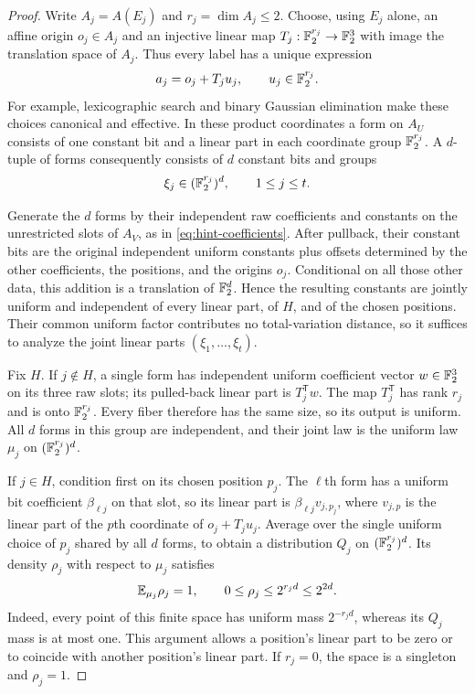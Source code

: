 \begin{proof}
Write $A_j=A(E_j)$ and $r_j=\dim A_j\le2$. Choose, using $E_j$ alone,
an affine origin $o_j\in A_j$ and an injective linear map
$T_j:\mathbb F_2^{r_j}\to\mathbb F_2^3$ with image the translation space of $A_j$.
Thus every label has a unique expression
\[
 a_j=o_j+T_ju_j,\qquad u_j\in\mathbb F_2^{r_j}.
\]
For example, lexicographic search and binary Gaussian elimination make
these choices canonical and effective. In these product coordinates a
form on $A_U$ consists of one constant bit and a linear part in each
coordinate group $\mathbb F_2^{r_j}$. A $d$-tuple of forms consequently consists
of $d$ constant bits and groups
\[
 \xi_j\in(\mathbb F_2^{r_j})^d,\qquad 1\le j\le t.
\]

Generate the $d$ forms by their independent raw coefficients and constants
on the unrestricted slots of $A_V$, as in
\eqref{eq:hint-coefficients}. After pullback, their constant bits are the
original independent uniform constants plus offsets determined by the
other coefficients, the positions, and the origins $o_j$. Conditional
on all those other data, this addition is a translation of $\mathbb F_2^d$.
Hence the resulting constants are jointly uniform and independent of
every linear part, of $H$, and of the chosen positions. Their common
uniform factor contributes no total-variation distance, so it suffices
to analyze the joint linear parts $(\xi_1,\ldots,\xi_t)$.

Fix $H$. If $j\notin H$, a single form has independent uniform coefficient
vector $w\in\mathbb F_2^3$ on its three raw slots; its pulled-back linear part
is $T_j^{\mathsf T}w$. The map $T_j^{\mathsf T}$ has rank $r_j$ and is
onto $\mathbb F_2^{r_j}$. Every fiber therefore has the same size, so its output
is uniform. All $d$ forms in this group are independent, and their joint
law is the uniform law $\mu_j$ on $(\mathbb F_2^{r_j})^d$.

If $j\in H$, condition first on its chosen position $p_j$. The $\ell$th
form has a uniform bit coefficient $\beta_{\ell j}$ on that slot, so its
linear part is $\beta_{\ell j}v_{j,p_j}$, where $v_{j,p}$ is the linear
part of the $p$th coordinate of $o_j+T_ju_j$. Average over the single
uniform choice of $p_j$ shared by all $d$ forms, to obtain a distribution
$Q_j$ on $(\mathbb F_2^{r_j})^d$. Its density $\rho_j$ with respect to $\mu_j$
satisfies
\begin{equation}\label{eq:local-density}
 \mathbb E_{\mu_j}\rho_j=1,\qquad
 0\le\rho_j\le2^{r_jd}\le2^{2d}.
\end{equation}
Indeed, every point of this finite space has uniform mass $2^{-r_jd}$,
whereas its $Q_j$ mass is at most one. This argument allows a position's
linear part to be zero or to coincide with another position's linear
part. If $r_j=0$, the space is a singleton and $\rho_j=1$.


\end{proof}
